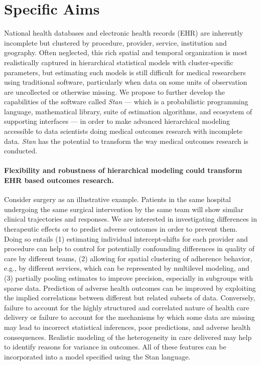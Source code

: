 \documentclass[11pt,notitlepage]{article}
\begin{document}
\section*{Specific Aims}
National health databases and electronic health records (EHR) are inherently incomplete but
clustered by procedure, provider, service, institution and geography. Often 
neglected, this rich spatial and temporal organization is most realistically 
captured in hierarchical statistical models with cluster-specific parameters, but 
estimating such models is still difficult for medical researchers using traditional software,
particularly when data on some units of observation are uncollected or otherwise missing.
We propose to further develop the capabilities of the software called \textit{Stan} --- 
which is a probabilistic programming language, mathematical library, suite of estimation
algorithms, and ecosystem of supporting interfaces --- in order to make advanced hierarchical  
modeling accessible to data scientists doing medical outcomes research with incomplete data.
\textit{Stan} has the potential to transform the way medical outcomes research is conducted.

\paragraph*{Flexibility and robustness of hierarchical modeling could 
transform EHR based outcomes research.} Consider surgery as an 
illustrative example. Patients in the same hospital undergoing the 
same surgical intervention by the same team will show similar clinical 
trajectories and responses. We are interested in investigating
differences in therapeutic effects or to predict adverse outcomes in order to prevent 
them. Doing so entails (1) estimating individual intercept-shifts for each provider and procedure
can help to control for potentially confounding differences 
in quality of care by different teams, (2) allowing for spatial clustering of adherence 
behavior, e.g., by different services, which can be represented by multilevel modeling, and
(3) partially pooling estimates to improve precision, especially in subgroups with sparse data.
Prediction of adverse health outcomes can be improved by exploiting the implied correlations between different but related subsets of data. 
Conversely, failure to account for the highly structured and correlated nature of health care delivery or
failure to account for the mechanisms by which some data are missing may lead 
to incorrect statistical inferences, poor predictions, and adverse health consequences. 
Realistic modeling of the heterogeneity in  care delivered may help to identify reasons for variance in outcomes.
All of these features can be incorporated into a model specified using the Stan language.
\end{document}
